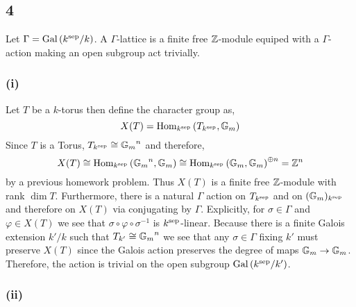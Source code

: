 \documentclass[12pt]{article}
\begin{document}
\subsection{4}

Let $\Gamma = \mathrm{Gal}\left( k^{\mathrm{sep}}/k \right)$. A $\Gamma$-lattice is a finite free $\mathbb{Z}$-module equiped with a $\Gamma$-action making an open subgroup act trivially. 

\subsubsection{(i)}

Let $T$ be a $k$-torus then define the character group as,
\[ X(T) = \mathrm{Hom}_{k^{\mathrm{sep}}} \left( T_{k^{\mathrm{sep}}}, {\mathbb{G}_m} \right) \]
Since $T$ is a Torus, $T_{k^{\mathrm{sep}}} \cong {\mathbb{G}_m}^n$ and therefore,
\[ X(T) \cong \mathrm{Hom}_{k^{\mathrm{sep}}} \left( {\mathbb{G}_m}^n, {\mathbb{G}_m} \right) \cong \mathrm{Hom}_{k^{\mathrm{sep}}} \left( {\mathbb{G}_m}, {\mathbb{G}_m} \right)^{\oplus n} = \mathbb{Z}^n \]
by a previous homework problem. Thus $X(T)$ is a finite free $\mathbb{Z}$-module with rank $\dim{T}$. Furthermore, there is a natural $\Gamma$ action on $T_{k^{\mathrm{sep}}}$ and on $({\mathbb{G}_m})_{k^{\mathrm{sep}}}$ and therefore on $X(T)$ via conjugating by $\Gamma$. Explicitly, for $\sigma \in \Gamma$ and $\varphi \in X(T)$ we see that $\sigma \circ \varphi \circ \sigma^{-1}$ is $k^{\mathrm{sep}}$-linear. Because there is a finite Galois extension $k' / k$ such that $T_{k'} \cong {\mathbb{G}_m}^n$ we see that any $\sigma \in \Gamma$ fixing $k'$ must preserve $X(T)$ since the Galois action preserves the degree of maps ${\mathbb{G}_m} \to {\mathbb{G}_m}$. Therefore, the action is trivial on the open subgroup $\mathrm{Gal}\left( k^{\mathrm{sep}}/k' \right)$.

\subsubsection{(ii)}
\end{document}
